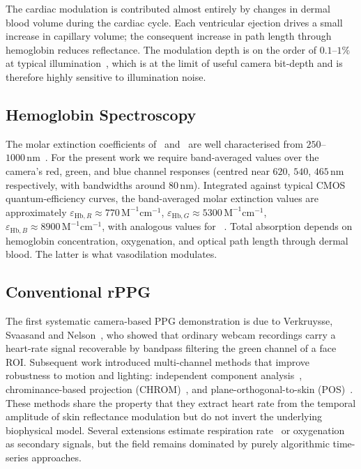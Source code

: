 \documentclass[10pt,twocolumn,a4paper]{article}
\theoremstyle{definition}
\newcommand{\Hb}{\mathrm{Hb}}
\newcommand{\HbO}{\mathrm{HbO_2}}
\begin{document}
The cardiac modulation is contributed almost entirely by changes in
dermal blood volume during the cardiac cycle. Each ventricular
ejection drives a small increase in capillary volume; the consequent
increase in path length through hemoglobin reduces reflectance. The
modulation depth is on the order of $0.1$--$1\%$ at typical
illumination~\cite{verkruysse2008}, which is at the limit of
useful camera bit-depth and is therefore highly sensitive to
illumination noise.

\subsection{Hemoglobin Spectroscopy}

The molar extinction coefficients of \HbO\ and \Hb\ are well
characterised from
$250$--$1000\,\mathrm{nm}$~\cite{prahlomlc,kim2005}. For the present
work we require band-averaged values over the camera's
red, green, and blue channel responses (centred near $620$, $540$,
$465\,\mathrm{nm}$ respectively, with bandwidths around $80\,\mathrm{nm}$).
Integrated against typical CMOS quantum-efficiency curves, the
band-averaged molar extinction values are approximately
$\varepsilon_{\Hb,R}\approx 770\,\mathrm{M^{-1}cm^{-1}}$,
$\varepsilon_{\Hb,G}\approx 5300\,\mathrm{M^{-1}cm^{-1}}$,
$\varepsilon_{\Hb,B}\approx 8900\,\mathrm{M^{-1}cm^{-1}}$, with
analogous values for \HbO~\cite{prahlomlc}. Total
absorption depends on hemoglobin concentration, oxygenation, and
optical path length through dermal blood. The latter is what
vasodilation modulates.

\subsection{Conventional rPPG}

The first systematic camera-based PPG demonstration is due to
Verkruysse, Svaasand and Nelson~\cite{verkruysse2008}, who showed that
ordinary webcam recordings carry a heart-rate signal recoverable by
bandpass filtering the green channel of a face ROI. Subsequent work
introduced multi-channel methods that improve robustness to motion
and lighting: independent component analysis~\cite{poh2010},
chrominance-based projection (CHROM)~\cite{dehaan2013chrom}, and
plane-orthogonal-to-skin (POS)~\cite{wang2017posrPPG}. These methods
share the property that they extract heart rate from the temporal
amplitude of skin reflectance modulation but do not invert the
underlying biophysical model. Several extensions estimate respiration
rate~\cite{tarassenko2014} or oxygenation~\cite{verkruysse2009} as
secondary signals, but the field remains dominated by purely
algorithmic time-series approaches.
\end{document}
